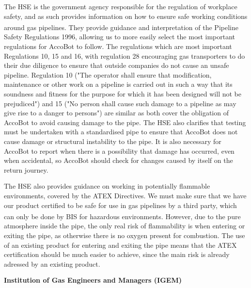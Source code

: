 \documentclass[11pt]{article}		%
\newcommand{\supercite}[1]{\textsuperscript{\cite{#1}}}		%
\begin{document}
			The HSE is the government agency responsible for the regulation of workplace safety, and as such provides information on how to ensure safe working conditions around gas pipelines.
			They provide guidance and interpretation\supercite{hse1996guide} of the Pipeline Safety Regulations 1996, allowing us to more easily select the most important regulations for AccoBot to follow.
			The regulations which are most important Regulations 10, 15 and 16, with regulation 28 encouraging gas transporters to do their due diligence to ensure that outside companies do not cause an unsafe pipeline.
			Regulation 10 ("The operator shall ensure that modification, maintenance or other work on a pipeline is carried out in such a way that its soundness and fitness for the purpose for which it has been designed will not be prejudiced") and 15 ("No person shall cause such damage to a pipeline as may give rise to a danger to persons") are similar as both cover the obligation of AccoBot to avoid causing damage to the pipe.
			The HSE also clarifies that testing must be undertaken with a standardised pipe to ensure that AccoBot does not cause damage or structural instability to the pipe.
			It is also necessary for AccoBot to report when there is a possibility that damage has occurred, even when accidental, so AccoBot should check for changes caused by itself on the return journey.
			
			The HSE also provides guidance on working in potentially flammable environments, covered by the ATEX Directives.
			We must make sure that we have our product certified to be safe for use in gas pipelines by a third party, which can only be done by BIS for hazardous environments\supercite{ATEX}.
			However, due to the pure atmosphere inside the pipe, the only real risk of flammability is when entering or exiting the pipe, as otherwise there is no oxygen present for combustion.
			The use of an existing product for entering and exiting the pipe means that the ATEX certification should be much easier to achieve, since the main risk is already adressed by an existing product.
			
			\textbf{Institution of Gas Engineers and Managers (IGEM)}
			
\end{document}
